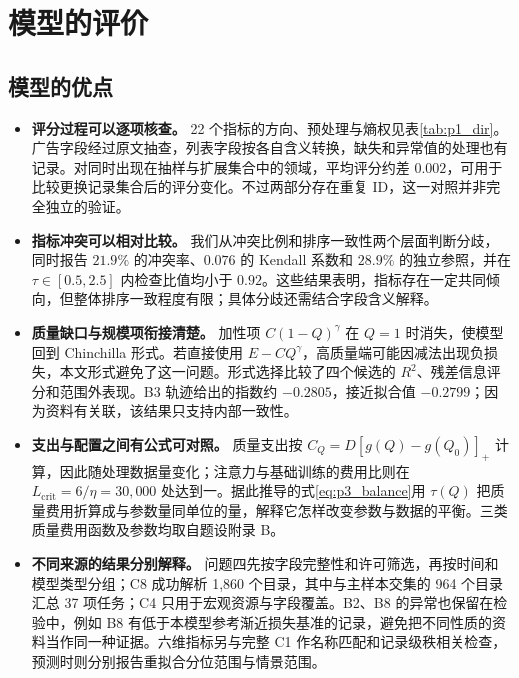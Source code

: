 \section{模型的评价}

\subsection{模型的优点}
\begin{itemize}[itemindent=2em]
\item \textbf{评分过程可以逐项核查。} 22 个指标的方向、预处理与熵权见表\ref{tab:p1_dir}。广告字段经过原文抽查，列表字段按各自含义转换，缺失和异常值的处理也有记录。对同时出现在抽样与扩展集合中的领域，平均评分约差 $0.002$，可用于比较更换记录集合后的评分变化。不过两部分存在重复 ID，这一对照并非完全独立的验证。
\item \textbf{指标冲突可以相对比较。} 我们从冲突比例和排序一致性两个层面判断分歧，同时报告 $21.9\%$ 的冲突率、$0.076$ 的 Kendall 系数和 $28.9\%$ 的独立参照，并在 $\tau\in[0.5,2.5]$ 内检查比值均小于 $0.92$。这些结果表明，指标存在一定共同倾向，但整体排序一致程度有限；具体分歧还需结合字段含义解释。
\item \textbf{质量缺口与规模项衔接清楚。} 加性项 $C(1-Q)^{\gamma}$ 在 $Q=1$ 时消失，使模型回到 Chinchilla 形式。若直接使用 $E-CQ^{\gamma}$，高质量端可能因减法出现负损失，本文形式避免了这一问题。形式选择比较了四个候选的 $R^2$、残差信息评分和范围外表现。B3 轨迹给出的指数约 $-0.2805$，接近拟合值 $-0.2799$；因为资料有关联，该结果只支持内部一致性。
\item \textbf{支出与配置之间有公式可对照。} 质量支出按 $C_Q=D[g(Q)-g(Q_0)]_+$ 计算，因此随处理数据量变化；注意力与基础训练的费用比则在 $L_{\text{crit}}=6/\eta=30{,}000$ 处达到一。据此推导的式\eqref{eq:p3_balance}用 $\tau(Q)$ 把质量费用折算成与参数量同单位的量，解释它怎样改变参数与数据的平衡。三类质量费用函数及参数均取自题设附录 B。
\item \textbf{不同来源的结果分别解释。} 问题四先按字段完整性和许可筛选，再按时间和模型类型分组；C8 成功解析 1,860 个目录，其中与主样本交集的 964 个目录汇总 37 项任务；C4 只用于宏观资源与字段覆盖。B2、B8 的异常也保留在检验中，例如 B8 有低于本模型参考渐近损失基准的记录，避免把不同性质的资料当作同一种证据。六维指标另与完整 C1 作名称匹配和记录级秩相关检查，预测时则分别报告重拟合分位范围与情景范围。
\end{itemize}

